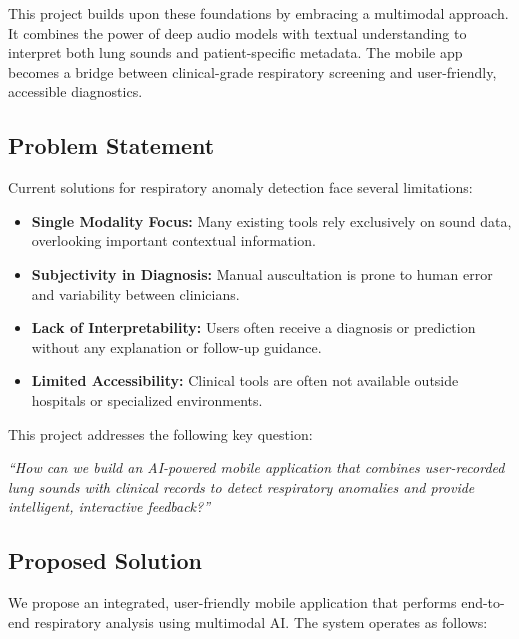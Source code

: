 This project builds upon these foundations by embracing a multimodal approach. It combines the power of deep audio models with textual understanding to interpret both lung sounds and patient-specific metadata. The mobile app becomes a bridge between clinical-grade respiratory screening and user-friendly, accessible diagnostics.

\subsection{Problem Statement}

Current solutions for respiratory anomaly detection face several limitations:
\begin{itemize}
    \item \textbf{Single Modality Focus:} Many existing tools rely exclusively on sound data, overlooking important contextual information.
    \item \textbf{Subjectivity in Diagnosis:} Manual auscultation is prone to human error and variability between clinicians.
    \item \textbf{Lack of Interpretability:} Users often receive a diagnosis or prediction without any explanation or follow-up guidance.
    \item \textbf{Limited Accessibility:} Clinical tools are often not available outside hospitals or specialized environments.
\end{itemize}

This project addresses the following key question:

\textit{“How can we build an AI-powered mobile application that combines user-recorded lung sounds with clinical records to detect respiratory anomalies and provide intelligent, interactive feedback?”}

\subsection{Proposed Solution}

We propose an integrated, user-friendly mobile application that performs end-to-end respiratory analysis using multimodal AI. The system operates as follows:

